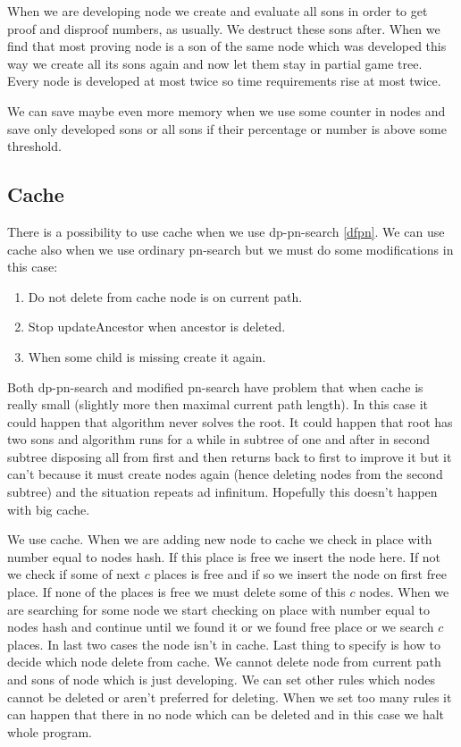 When we are developing node we create and evaluate all sons in order to get
proof and disproof numbers, as usually. We destruct these sons after. When we
find that most proving node is a son of the same node which was developed this
way we create all its sons again and now let them stay in partial game tree.
Every node is developed at most twice so time requirements rise at most twice.

We can save maybe even more memory when we use some counter in nodes
and save only developed sons or all sons if their percentage or number is 
above some threshold.

\subsection{Cache }

There is a possibility to use cache when we use dp-pn-search \ref{dfpn}.
We can use cache also when we use ordinary pn-search but we must
do some modifications in this case: 

\begin{enumerate}
\item Do not delete from cache node is on current path.
\item Stop updateAncestor when ancestor is deleted.
\item When some child is missing create it again.
\end{enumerate}

Both dp-pn-search and modified pn-search have problem that when cache is really small (slightly
more then maximal current path length). In this case it could happen that algorithm
never solves the root. It could happen that root has
two sons and algorithm runs for a while in subtree of one and after in second
subtree disposing all from first and then returns back to first to improve
it but it can't because it must create nodes again (hence deleting nodes from the
second subtree) and the situation repeats ad infinitum. 
Hopefully this doesn't happen with big cache.

We use  cache. When we are adding new node to
cache we check in place with number equal to nodes hash. If this place is free
we insert the node here. If not we check if some of next $c$ places is free and
if so we insert the node on first free place. If none of the places is free we
must delete some of this $c$ nodes. When we are searching for some node we
start checking on place with number equal to nodes hash and continue until we
found it or we found free place or we search $c$ places. In last two cases the
node isn't in cache. Last thing to specify is how to decide which node delete
from cache. We cannot delete node from current path and sons of node which is
just developing. We can set other rules which nodes cannot be deleted or aren't
preferred for deleting. When we set too many rules it can happen that there in
no node which can be deleted and in this case we halt whole program. 

